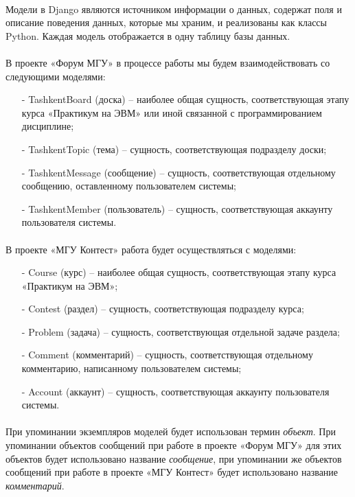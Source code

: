 \documentclass[12pt, a4paper, oneside]{article}
\begin{document}
\paragraph{}
Модели в Django являются источником информации о данных, содержат поля и описание поведения данных, которые мы храним, и реализованы как классы Python. Каждая модель отображается в одну таблицу базы данных.
\paragraph{}
В проекте «Форум МГУ» в процессе работы мы будем взаимодействовать со следующими моделями:
\begin{itemize}
    \item[-] TashkentBoard (доска) – наиболее общая сущность, соответствующая этапу курса «Практикум на ЭВМ» или иной связанной с программированием дисциплине;
    \item[-] TashkentTopic (тема) – сущность, соответствующая подразделу доски;
    \item[-] TashkentMessage (сообщение) – сущность, соответствующая отдельному сообщению, оставленному пользователем системы;
    \item[-] TashkentMember (пользователь) – сущность, соответствующая аккаунту пользователя системы.
\end{itemize}
\paragraph{}
В проекте «МГУ Контест» работа будет осуществляться с моделями:
\begin{itemize}
    \item[-] Course (курс) – наиболее общая сущность, соответствующая этапу курса «Практикум на ЭВМ»;
    \item[-] Contest (раздел) – сущность, соответствующая подразделу курса;
    \item[-] Problem (задача) – сущность, соответствующая отдельной задаче раздела;
    \item[-] Comment (комментарий) – сущность, соответствующая отдельному комментарию, написанному пользователем системы; 
    \item[-] Account (аккаунт) – сущность, соответствующая аккаунту пользователя системы.
\end{itemize}
\paragraph{}
При упоминании экземпляров моделей будет использован термин \textit{объект}. При упоминании объектов сообщений при работе в проекте «Форум МГУ» для этих объектов будет использовано название \textit{сообщение}, при упоминании же объектов сообщений при работе в проекте «МГУ Контест» будет использовано название \textit{комментарий}.
\newpage
\end{document}

